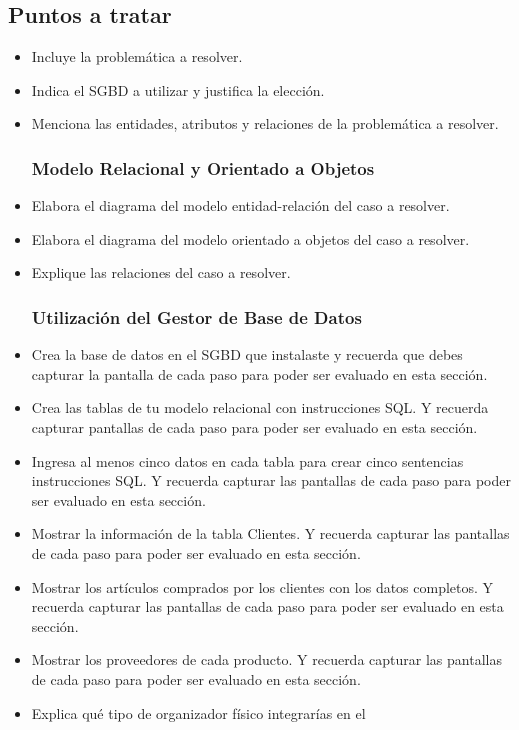 \documentclass[spanish,12pt,letterpapper]{article}
\begin{document}
	\subsection{Puntos a tratar}
	\begin{itemize}
	\subsubsection{Identificación de un SGBD}
	\item Incluye la problemática a resolver.
	\item Indica el SGBD a utilizar y justifica la elección.
	\item Menciona las entidades, atributos y relaciones de la problemática a resolver.
	\subsubsection{Modelo Relacional y Orientado a Objetos}
	\item Elabora el diagrama del modelo entidad-relación del caso a resolver.
	\item Elabora el diagrama del modelo orientado a objetos del caso a resolver.
	\item Explique las relaciones del caso a resolver.
	\subsubsection{Utilización del Gestor de Base de Datos}
	\item Crea la base de datos en el SGBD que instalaste y recuerda que debes capturar la pantalla de cada paso para poder ser evaluado en esta sección.
	\item Crea las tablas de tu modelo relacional con instrucciones SQL. Y recuerda capturar pantallas de cada paso para poder ser evaluado en esta sección.
	\item Ingresa al menos cinco datos en cada tabla para crear cinco sentencias instrucciones SQL. Y recuerda capturar las pantallas de cada paso para poder ser evaluado en esta sección.
	\item Mostrar la información de la tabla Clientes. Y recuerda capturar las pantallas de cada paso para poder ser evaluado en esta sección.
	\item Mostrar los artículos comprados por los clientes con los datos completos. Y recuerda capturar las pantallas de cada paso para poder ser evaluado en esta sección.
	\item Mostrar los proveedores de cada producto. Y recuerda capturar las pantallas de cada paso para poder ser evaluado en esta sección.
	\item Explica qué tipo de organizador físico integrarías en el

\end{itemize}
\end{document}
